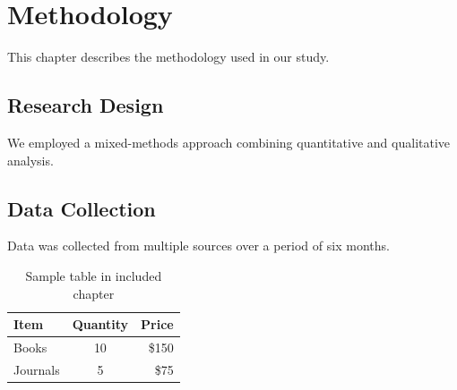 \section{Methodology}
\label{sec:method}

This chapter describes the methodology used in our study.

\subsection{Research Design}
We employed a mixed-methods approach combining quantitative and qualitative analysis.

\subsection{Data Collection}
Data was collected from multiple sources over a period of six months.

\begin{table}[h]
    \centering
    \begin{tabular}{|l|c|r|}
        \hline
        Item & Quantity & Price \\
        \hline
        Books & 10 & \$150 \\
        Journals & 5 & \$75 \\
        \hline
    \end{tabular}
    \caption{Sample table in included chapter}
    \label{tab:sample}
\end{table}
